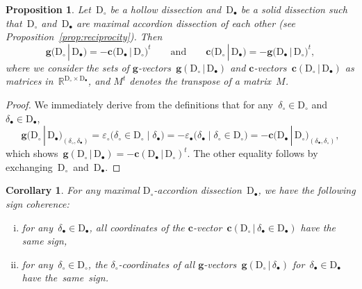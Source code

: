 \documentclass{amsart}
\newtheorem{corollary}[theorem]{Corollary}
\newtheorem{proposition}[theorem]{Proposition}
\theoremstyle{definition}
\newcommand{\R}{\mathbb{R}} %
\renewcommand{\b}[1]{\mathbf{#1}} %
\newcommand{\transpose}[1]{{#1}^t} %
\newcommand{\darkblue}{\color{darkblue}} %
\newcommand{\defn}[1]{\textsl{\darkblue #1}} %
\newcommand{\dissection}{\mathrm{D}} %
\newcommand{\signcirc}[3]{{\varepsilon_\circ \big( {#1} \in {#2} \;|\; {#3} \big)}} %
\newcommand{\signbullet}[3]{{\varepsilon_\bullet \big( {#1} \;|\; {#3} \in {#2} \big)}} %
\newcommand{\gvector}[2]{\mathbf{g}(#1 \,|\, #2)} %
\newcommand{\gvectors}[2]{\mathbf{g}(#1 \,|\, #2)} %
\newcommand{\biggvectors}[2]{\mathbf{g} \big( #1 \,|\, #2 \big)} %
\newcommand{\cvector}[3]{\mathbf{c}(#1  \,|\, #3 \in #2)} %
\newcommand{\cvectors}[2]{\mathbf{c}(#1  \,|\, #2)} %
\newcommand{\bigcvectors}[2]{\mathbf{c} \big( #1  \,|\, #2 \big)} %
\begin{document}
\begin{proposition}
\label{prop:reciprocitygcvectors}
Let~$\dissection_\circ$ be a hollow dissection and~$\dissection_\bullet$ be a solid dissection such that~$\dissection_\circ$ and~$\dissection_\bullet$ are maximal accordion dissection of each other (see Proposition~\ref{prop:reciprocity}). Then
\[
\biggvectors{\dissection_\circ}{\dissection_\bullet} = -\transpose{\bigcvectors{\dissection_\bullet}{\dissection_\circ}}
\qquad\text{and}\qquad
\bigcvectors{\dissection_\circ}{\dissection_\bullet} = -\transpose{\biggvectors{\dissection_\bullet}{\dissection_\circ}},
\]
where we consider the sets of $\b{g}$-vectors~$\gvectors{\dissection_\circ}{\dissection_\bullet}$ and $\b{c}$-vectors~$\cvectors{\dissection_\circ}{\dissection_\bullet}$ as matrices in~$\R^{\dissection_\circ \times \dissection_\bullet}$, and $\transpose{M}$ denotes the transpose of a matrix~$M$.
\end{proposition}

\begin{proof}
We immediately derive from the definitions that for any~$\delta_\circ \in \dissection_\circ$ and~$\delta_\bullet \in \dissection_\bullet$,
\[
\biggvectors{\dissection_\circ}{\dissection_\bullet}_{(\delta_\circ, \delta_\bullet)} = \signcirc{\delta_\circ}{\dissection_\circ}{\delta_\bullet} = -\signbullet{\delta_\bullet}{\dissection_\circ}{\delta_\circ} = -\bigcvectors{\dissection_\bullet}{\dissection_\circ}_{(\delta_\bullet, \delta_\circ)},
\]
which shows~$\gvectors{\dissection_\circ}{\dissection_\bullet} = -\transpose{\cvectors{\dissection_\bullet}{\dissection_\circ}}$. The other equality follows by exchanging~$\dissection_\circ$~and~$\dissection_\bullet$.
\end{proof}

\begin{corollary}
\label{coro:signCoherence}
For any maximal $\dissection_\circ$-accordion dissection~$\dissection_\bullet$, we have the following \defn{sign coherence}:
\begin{enumerate}[(i)]
\item for any~$\delta_\bullet \in \dissection_\bullet$, all coordinates of the $\b{c}$-vector~$\cvector{\dissection_\circ}{\dissection_\bullet}{\delta_\bullet}$ have the same sign,
\item for any~$\delta_\circ \in \dissection_\circ$, the $\delta_\circ$-coordinates of all $\b{g}$-vectors~$\gvector{\dissection_\circ}{\delta_\bullet}$ for~$\delta_\bullet \in \dissection_\bullet$ have the~same~sign.
\end{enumerate}
\end{corollary}
\end{document}
